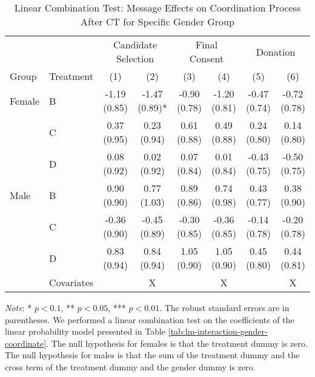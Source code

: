 \documentclass[12pt, a4paper]{article}
\begin{document}
\begin{table}[H]

\caption{\label{tab:lh-interaction-gender-coordinate}Linear Combination Test: Message Effects on Coordination Process After CT for Specific Gender Group}
\centering
\fontsize{8}{10}\selectfont
\begin{threeparttable}
\begin{tabular}[t]{llcccccc}
\toprule
\multicolumn{2}{c}{ } & \multicolumn{2}{c}{Candidate Selection} & \multicolumn{2}{c}{Final Consent} & \multicolumn{2}{c}{Donation} \\
\cmidrule(l{3pt}r{3pt}){3-4} \cmidrule(l{3pt}r{3pt}){5-6} \cmidrule(l{3pt}r{3pt}){7-8}
Group & Treatment & (1) & (2) & (3) & (4) & (5) & (6)\\
\midrule
Female & B & -1.19 (0.85) & -1.47 (0.89)* & -0.90 (0.78) & -1.20 (0.81) & -0.47 (0.74) & -0.72 (0.78)\\
 & C & 0.37 (0.95) & 0.23 (0.94) & 0.61 (0.88) & 0.49 (0.88) & 0.24 (0.80) & 0.14 (0.80)\\
 & D & 0.08 (0.92) & 0.02 (0.92) & 0.07 (0.84) & 0.01 (0.84) & -0.43 (0.75) & -0.50 (0.75)\\
Male & B & 0.90 (0.90) & 0.77 (1.03) & 0.89 (0.86) & 0.74 (0.98) & 0.43 (0.77) & 0.38 (0.90)\\
 & C & -0.36 (0.90) & -0.45 (0.89) & -0.30 (0.85) & -0.36 (0.85) & -0.14 (0.78) & -0.20 (0.78)\\
 & D & 0.83 (0.94) & 0.84 (0.94) & 1.05 (0.90) & 1.05 (0.90) & 0.45 (0.80) & 0.44 (0.81)\\
\midrule
 & Covariates &  & X &  & X &  & X\\
\bottomrule
\end{tabular}
\begin{tablenotes}
\item \emph{Note}: * $p < 0.1$, ** $p < 0.05$, *** $p < 0.01$. The robust standard errors are in parentheses. We performed a linear combination test on the coefficients of the linear probability model presented in Table \ref{tab:lm-interaction-gender-coordinate}. The null hypothesis for females is that the treatment dummy is zero. The null hypothesis for males is that the sum of the treatment dummy and the cross term of the treatment dummy and the gender dummy is zero.
\end{tablenotes}
\end{threeparttable}
\end{table}
\end{document}
